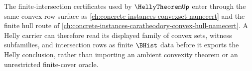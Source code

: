 The finite-intersection certificates used by $\HellyTheoremUp$ enter through the same convex-row surface as \autoref{ch:concrete-instances-convexset-namecert} and the finite hull route of \autoref{ch:concrete-instances-caratheodory-convex-hull-namecert}. A Helly carrier can therefore read its displayed family of convex sets, witness subfamilies, and intersection rows as finite $\BHist$ data before it exports the Helly conclusion, rather than importing an ambient convexity theorem or an unrestricted finite-cover oracle.
